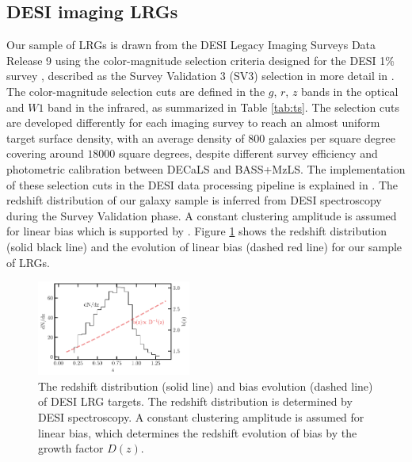 \subsection{DESI imaging LRGs}
Our sample of LRGs is drawn from the DESI Legacy Imaging Surveys Data Release 9 \citep[DR9;][]{dey2018overview} using the color-magnitude selection criteria designed for the DESI 1\% survey , described as the Survey Validation 3 (SV3) selection in more detail in \cite{zhou2022target}. The color-magnitude selection cuts are defined in the $g$, $r$, $z$ bands in the optical and $W1$ band in the infrared, as summarized in Table \ref{tab:ts}. The selection cuts are developed differently for each imaging survey to reach an almost uniform target surface density, with an average density of $800$ galaxies per square degree covering around $18000$ square degrees, despite different survey efficiency and photometric calibration between DECaLS and BASS+MzLS. The implementation of these selection cuts in the DESI data processing pipeline is explained in \cite{myers2022}. The redshift distribution of our galaxy sample is inferred from DESI spectroscopy during the Survey Validation phase. A constant clustering amplitude is assumed for linear bias which is supported by \cite{zhou2021clustering}. Figure \ref{fig:nz} shows the redshift distribution (solid black line) and the evolution of linear bias (dashed red line) for our sample of LRGs.

\begin{figure}
 \centering
 \includegraphics[width=0.45\textwidth]{figures/nz_lrg.pdf}
 \caption{The redshift distribution (solid line) and bias evolution (dashed line) of DESI LRG targets. The redshift distribution is determined by DESI spectroscopy. A constant clustering amplitude is assumed for linear bias, which determines the redshift evolution of bias by the growth factor $D(z)$.}
 \label{fig:nz}
\end{figure}

